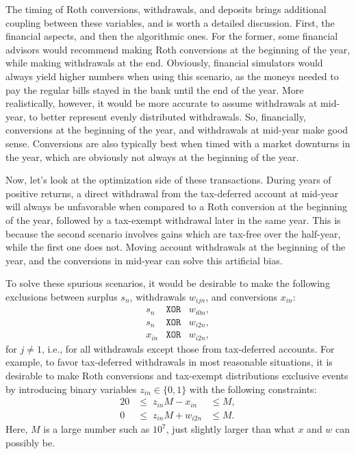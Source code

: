 \documentclass{report}[fleqn,11pt]
\begin{document}
	The timing of Roth conversions, withdrawals, and deposits brings
	additional coupling between these variables, and is worth a detailed discussion.
	First, the financial aspects, and then the algorithmic ones.
	For the former, some financial advisors would recommend making Roth
	conversions at the beginning of the year, while making withdrawals
	at the end. Obviously, financial simulators would always yield higher numbers
	when using this scenario, as the moneys needed to pay the regular bills 
	stayed in the bank until the end of the year. More realistically,
	however, it would be more accurate to assume withdrawals at mid-year,
	to better represent evenly distributed withdrawals. So, financially,
	conversions at the beginning of the year, and withdrawals at mid-year
	make good sense. Conversions are also typically best when
	timed with a market downturns in the year, which are obviously not always at the
	beginning of the year.

	Now, let's look at the optimization side of these transactions.
	During years of positive returns,
	a direct withdrawal from the tax-deferred account at mid-year will always
	be unfavorable when compared to a Roth conversion
	at the beginning of the year, followed
	by a tax-exempt withdrawal later in the same year.
	This is because the second
	scenario involves gains which are tax-free over the half-year, while
	the first one does not. Moving account withdrawals at the beginning
	of the year, and the conversions in mid-year can solve this artificial bias.

	To solve these spurious scenarios, it would be desirable to make the following exclusions
	between surplus $s_n$, withdrawals $w_{ijn}$, and conversions $x_{in}$:
	\begin{eqnarray*}
		s_n &\texttt{XOR} & w_{i0n}, \\
		s_n &\texttt{XOR} & w_{i2n}, \\
		x_{in} &\texttt{XOR} & w_{i2n},
	\end{eqnarray*}
	for $j \neq 1$, i.e., for all withdrawals except those from tax-deferred accounts.
	For example, to favor tax-deferred withdrawals in most reasonable situations,
	it is desirable to make Roth conversions and tax-exempt distributions exclusive events
	by introducing binary variables $z_{in} \in \{0, 1\}$ with the following constraints:
	\begin{alignat}{2}
		\label{Eq:Binary}
		0 & \le \; z_{in}M - x_{in} &\le M, \nonumber \\
		0 & \le \; z_{in}M + w_{i2n} &\le M.
	\end{alignat}
	Here, $M$ is a large number such as $10^7$, just slightly
	larger than what $x$ and $w$ can possibly be.
\end{document}

